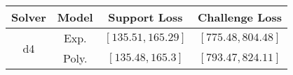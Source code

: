 \begin{tabular}{cc|c|c} 
\hline 
 Solver & Model & Support Loss  & Challenge Loss \tabularnewline\hline 
\hline 
\multirow{2}{*}{d4} & Exp. & $\left[135.51,165.29\right]$ & $\left[775.48,804.48\right]$ \tabularnewline 
 & Poly. & $\left[135.48,165.3\right]$ & $\left[793.47,824.11\right]$ \tabularnewline 
\hline 
\end{tabular} 

